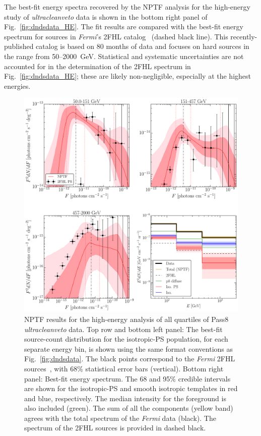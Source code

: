 The best-fit energy spectra recovered by the NPTF analysis for the high-energy study of  {\it ultracleanveto} data is shown in the bottom right panel of Fig.~\ref{fig:dndsdata_HE}.
The fit results are compared with the best-fit  energy spectrum for sources in \emph{Fermi}'s 2FHL catalog~\cite{Ackermann:2015uya} (dashed black line).  This recently-published catalog is based on 80 months of data and focuses on hard sources in the range from 50--2000~GeV.  Statistical and systematic uncertainties are not accounted for in the determination of the 2FHL spectrum in Fig.~\ref{fig:dndsdata_HE}; these are likely non-negligible, especially at the highest energies.
\begin{figure}[!phtb] %
   \centering
   \includegraphics[width=\textwidth]{ch-igrb/plots/N128UHEp8-0K-SourceCounts-final-700-E15-p8-3br.pdf} 
   \caption{NPTF results for the high-energy analysis of all quartiles of Pass8 {\it ultracleanveto} data. Top row and bottom left panel:  The best-fit source-count distribution for the isotropic-PS population, for each separate energy bin, is shown using the same format conventions as Fig.~\ref{fig:dndsdata}.  The black points correspond to the \emph{Fermi} 2FHL sources~\cite{Ackermann:2015uya}, with 68\% statistical error bars (vertical).  Bottom right panel: Best-fit energy spectrum.  The 68 and 95\% credible intervals are shown for the isotropic-PS and smooth isotropic templates in red and blue, respectively.  The median intensity for the foreground is also included (green).  The sum of all the components (yellow band) agrees with the total spectrum of the \emph{Fermi} data (black).  The spectrum of the 2FHL sources is provided in dashed black.  %
}
\end{figure}
